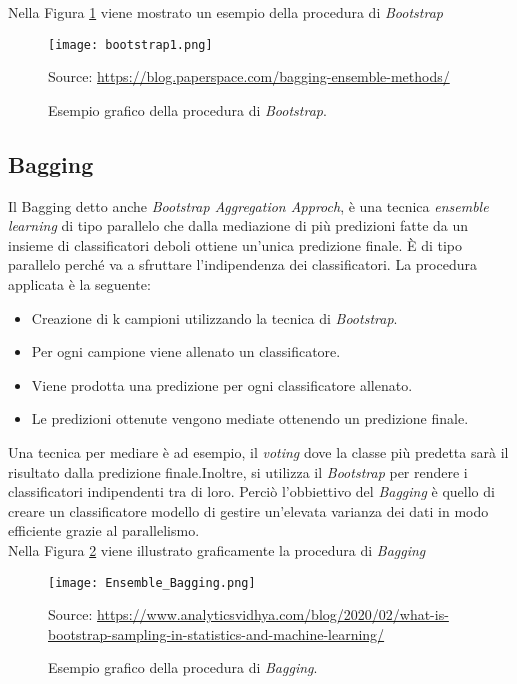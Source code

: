 Nella Figura \ref{fig:bootstrap} viene mostrato un esempio della procedura di \emph{Bootstrap}

\begin{figure}[]
	\begin{center}
		\texttt{[image: bootstrap1.png]}
		\caption{Esempio grafico della procedura di \emph{Bootstrap}.
		} 
		Source: \url{https://blog.paperspace.com/bagging-ensemble-methods/}\label{fig:bootstrap}
	\end{center}
\end{figure}

\subsection{Bagging}
Il Bagging \textit{\cite{breiman1996bagging}} detto anche \emph{Bootstrap Aggregation Approch}, è una tecnica \emph{ensemble learning} di tipo parallelo che dalla mediazione di più predizioni fatte da un insieme di classificatori deboli ottiene un'unica predizione finale. È di tipo parallelo perché va a sfruttare l'indipendenza dei classificatori. La procedura applicata è la seguente:
\begin{itemize}
	\item Creazione di k campioni utilizzando la tecnica di \emph{Bootstrap}.
	\item Per ogni campione viene allenato un classificatore.
	\item Viene prodotta una predizione per ogni classificatore allenato.
	\item Le predizioni ottenute vengono mediate ottenendo un predizione finale.
\end{itemize} 
Una tecnica per mediare è ad esempio, il \emph{voting} dove la classe più predetta sarà il risultato dalla predizione finale.Inoltre, si utilizza il \emph{Bootstrap} per rendere i classificatori indipendenti tra di loro.
Perciò l'obbiettivo del \emph{Bagging} è quello di creare un classificatore modello di gestire un'elevata varianza dei dati in modo efficiente grazie al parallelismo.\\
Nella Figura \ref{fig:bagging} viene illustrato graficamente la procedura di \emph{Bagging}

\begin{figure}[]
	\begin{center}
		\texttt{[image: Ensemble\_Bagging.png]}
		\caption{Esempio grafico della procedura di \emph{Bagging}.
		} 
		Source: \url{https://www.analyticsvidhya.com/blog/2020/02/what-is-bootstrap-sampling-in-statistics-and-machine-learning/}\label{fig:bagging}
	\end{center}
\end{figure}

